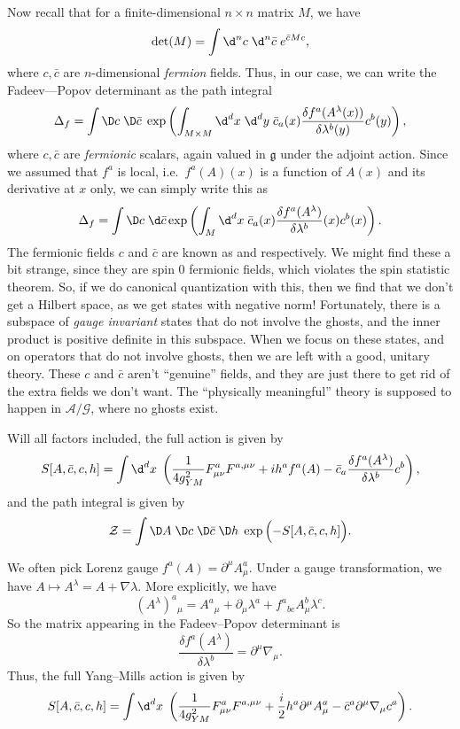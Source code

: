 \documentclass[a4paper]{article}
\begin{document}
Now recall that for a finite-dimensional $n \times n$ matrix $M$, we have
\[
  \det (M) = \int \d^n c\; \d^n \bar{c}\; e^{\bar{c} M c},
\]
where $c, \bar{c}$ are $n$-dimensional \emph{fermion} fields. Thus, in our case, we can write the Fadeev---Popov determinant as the path integral
\[
  \Delta_f = \int \D c\; \D \bar{c}\;\exp \left(\int_{M \times M} \d^d x\;\d^d y\; \bar{c}_a(x) \frac{\delta f^a(A^\lambda(x))}{\delta \lambda^b(y)} c^b(y)\right),
\]
where $c, \bar{c}$ are \emph{fermionic} scalars, again valued in $\mathfrak{g}$ under the adjoint action. Since we assumed that $f^a$ is local, i.e.\ $f^a(A)(x)$ is a function of $A(x)$ and its derivative at $x$ only, we can simply write this as
\[
  \Delta_f = \int \D c\; \d \bar{c} \exp \left(\int_M \d^d x\; \bar{c}_a (x) \frac{\delta f^a(A^\lambda)}{\delta \lambda^b}(x) c^b(x)\right).
\]
The fermionic fields $c$ and $\bar{c}$ are known as  and  respectively. We might find these a bit strange, since they are spin $0$ fermionic fields, which violates the spin statistic theorem. So, if we do canonical quantization with this, then we find that we don't get a Hilbert space, as we get states with negative norm! Fortunately, there is a subspace of \emph{gauge invariant} states that do not involve the ghosts, and the inner product is positive definite in this subspace. When we focus on these states, and on operators that do not involve ghosts, then we are left with a good, unitary theory. These $c$ and $\bar{c}$ aren't ``genuine'' fields, and they are just there to get rid of the extra fields we don't want. The ``physically meaningful'' theory is supposed to happen in $\mathcal{A}/\mathcal{G}$, where no ghosts exist.

Will all factors included, the full action is given by
\[
  S[A, \bar{c}, c, h] = \int \d^d x\; \left(\frac{1}{4g_{YM}^2} F_{\mu\nu}^a F^{a, \mu\nu} + ih^a f^a(A) - \bar{c}_a \frac{\delta f^a(A^\lambda)}{\delta \lambda^b}c^b\right),
\]
and the path integral is given by
\[
  \mathcal{Z} = \int \D A\; \D c\; \D \bar{c}\;\D h\; \exp\Big({-S}[A, \bar{c}, c, h]\Big).
\]
\begin{eg}
  We often pick Lorenz gauge $f^a(A) = \partial^\mu A_\mu^a$. Under a gauge transformation, we have $A \mapsto A^\lambda = A + \nabla \lambda$. More explicitly, we have
  \[
    (A^\lambda)^a\!_\mu = A^a\!_\mu + \partial_\mu \lambda^a + f^a\!_{bc} A_\mu^b \lambda^c.
  \]
  So the matrix appearing in the Fadeev--Popov determinant is
  \[
    \frac{\delta f^a(A^\lambda)}{\delta \lambda^b} = \partial^\mu\nabla_\mu.
  \]
  Thus, the full Yang--Mills action is given by
  \[
    S[A, \bar{c}, c, h] =\int \d^d x\; \left( \frac{1}{4g^2_{YM}} F_{\mu\nu}^a F^{a,\mu\nu} + \frac{i}{2} h^a \partial^\mu A_\mu^a - \bar{c}^a \partial^\mu \nabla_\mu c^a\right).
  \]
\end{eg}
\end{document}
